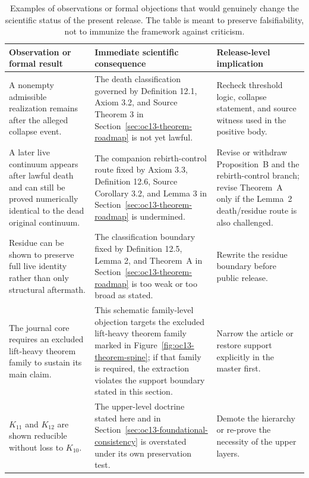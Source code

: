 \begin{table}[htbp]
\centering
\begingroup
\footnotesize
\RaggedRight
\setlength{\tabcolsep}{4pt}
\begin{tabular}{@{}L{0.27\textwidth}L{0.36\textwidth}L{0.22\textwidth}@{}}
\toprule
\textbf{Observation or formal result} & \textbf{Immediate scientific consequence} & \textbf{Release-level implication} \\
\midrule
A nonempty admissible realization remains after the alleged collapse event. & The death classification governed by Definition 12.1, Axiom 3.2, and Source Theorem 3 in Section~\ref{sec:oc13-theorem-roadmap} is not yet lawful. & Recheck threshold logic, collapse statement, and source witness used in the positive body. \\
A later live continuum appears after lawful death and can still be proved numerically identical to the dead original continuum. & The companion rebirth-control route fixed by Axiom 3.3, Definition 12.6, Source Corollary 3.2, and Lemma 3 in Section~\ref{sec:oc13-theorem-roadmap} is undermined. & Revise or withdraw Proposition~B and the rebirth-control branch; revise Theorem~A only if the Lemma~2 death/residue route is also challenged. \\
Residue can be shown to preserve full live identity rather than only structural aftermath. & The classification boundary fixed by Definition 12.5, Lemma 2, and Theorem~A in Section~\ref{sec:oc13-theorem-roadmap} is too weak or too broad as stated. & Rewrite the residue boundary before public release. \\
The journal core requires an excluded lift-heavy theorem family to sustain its main claim. & This schematic family-level objection targets the excluded lift-heavy theorem family marked in Figure~\ref{fig:oc13-theorem-spine}; if that family is required, the extraction violates the support boundary stated in this section. & Narrow the article or restore support explicitly in the master first. \\
\(K_{11}\) and \(K_{12}\) are shown reducible without loss to \(K_{10}\). & The upper-level doctrine stated here and in Section~\ref{sec:oc13-foundational-consistency} is overstated under its own preservation test. & Demote the hierarchy or re-prove the necessity of the upper layers. \\
\bottomrule
\end{tabular}
\endgroup
\caption{Examples of observations or formal objections that would genuinely change the scientific
status of the present release. The table is meant to preserve falsifiability, not to immunize the
framework against criticism.}
\label{tab:oc13-counterexamples}
\end{table}

